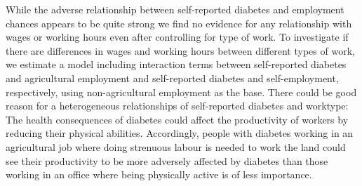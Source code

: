 While the adverse relationship between self-reported diabetes and
employment chances appears to be quite strong we find no evidence
for any relationship with wages or working hours even after controlling for type of work. To investigate if
there are differences in wages and working hours between different
types of work, we estimate a model including interaction terms between
self-reported diabetes and agricultural employment and self-reported
diabetes and self-employment, respectively, using non-agricultural employment as
the base. There could be good reason for a heterogeneous relationships
of self-reported diabetes and worktype: The health consequences of
diabetes could affect the productivity of workers by reducing their physical abilities.  Accordingly, people with diabetes working in an agricultural job where doing strenuous labour is needed to work the land could see their productivity to be more adversely affected by diabetes than those working in an office where being physically active is of less importance.   

